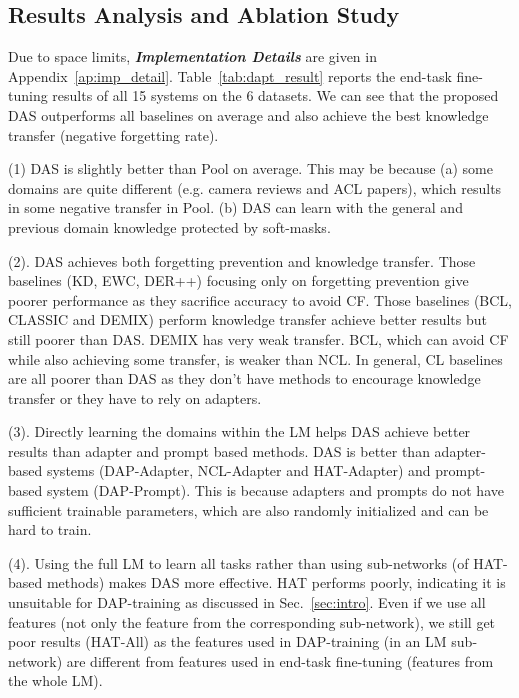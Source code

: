 \documentclass{article} \usepackage{iclr2023_conference,times}
\begin{document}
\vspace{-2mm}
\subsection{Results Analysis and Ablation Study}
\label{sec:results}
\vspace{-1mm}
Due to space limits, \textit{\textbf{Implementation Details}} are given in  Appendix~\ref{ap:imp_detail}. Table~\ref{tab:dapt_result} reports the end-task fine-tuning results of all 15 systems on the 6 datasets. We can see that the proposed DAS outperforms all baselines on average and also achieve the best knowledge transfer (negative forgetting rate). 











{\color{black}(1) DAS is slightly better than Pool on average. This may be because (a) some domains are quite different (e.g. camera reviews and ACL papers), which results in some negative transfer in Pool. {\color{black}(b) DAS 
can learn with the general and previous domain knowledge protected by soft-masks.}}

(2). DAS achieves both forgetting prevention and knowledge transfer. Those baselines (KD, EWC, DER++) focusing only on forgetting prevention give poorer performance as they sacrifice accuracy to avoid CF. Those baselines (BCL, CLASSIC and DEMIX) perform knowledge transfer achieve better results but still poorer than DAS. DEMIX has very weak transfer. BCL, which can avoid CF while also achieving some transfer, is weaker than NCL. In general, CL baselines are all poorer than DAS as they don’t have methods to encourage knowledge transfer or they have to rely on adapters.

(3). Directly learning the domains within the LM helps DAS achieve better results than adapter and prompt based methods. {\color{black}DAS is better than adapter-based systems (DAP-Adapter, NCL-Adapter and HAT-Adapter) and prompt-based system (DAP-Prompt).} This is because adapters and prompts do not have sufficient trainable parameters,  which are also randomly initialized and can be hard to train. 

{\color{black}(4).} Using the full LM to learn all tasks rather than using sub-networks (of HAT-based methods) makes DAS more effective. HAT performs poorly, indicating it is unsuitable for DAP-training as discussed in Sec.~\ref{sec:intro}. Even if we use all features (not only the feature from the corresponding sub-network), we still get poor results (HAT-All) as the features used in DAP-training (in an LM sub-network) are different from features used in end-task fine-tuning (features from the whole LM). 
\end{document}

